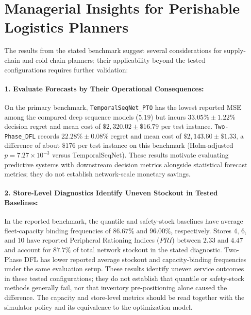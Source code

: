 \documentclass[11pt,a4paper]{article}
\theoremstyle{definition}
\theoremstyle{remark}
\begin{document}
\FloatBarrier
\section{Managerial Insights for Perishable Logistics Planners}
\label{sec:managerial_insights}

The results from the stated benchmark suggest several considerations for supply-chain and cold-chain planners; their applicability beyond the tested configurations requires further validation:

\paragraph{1. Evaluate Forecasts by Their Operational Consequences:}
On the primary benchmark, \texttt{TemporalSeqNet\_PTO} has the lowest reported MSE among the compared deep sequence models ($5.19$) but incurs $33.05\% \pm 1.22\%$ decision regret and mean cost of $\$2,320.02 \pm \$16.79$ per test instance. \texttt{Two-Phase\_DFL} records $22.28\% \pm 0.08\%$ regret and mean cost of $\$2,143.60 \pm \$1.33$, a difference of about $\$176$ per test instance on this benchmark (Holm-adjusted $p = 7.27 \times 10^{-3}$ versus TemporalSeqNet). These results motivate evaluating predictive systems with downstream decision metrics alongside statistical forecast metrics; they do not establish network-scale monetary savings.

\paragraph{2. Store-Level Diagnostics Identify Uneven Stockout in Tested Baselines:}
In the reported benchmark, the quantile and safety-stock baselines have average fleet-capacity binding frequencies of $86.67\%$ and $96.00\%$, respectively. Stores 4, 6, and 10 have reported Peripheral Rationing Indices ($PRI$) between $2.33$ and $4.47$ and account for $87.7\%$ of total network stockout in the stated diagnostic. Two-Phase DFL has lower reported average stockout and capacity-binding frequencies under the same evaluation setup. These results identify uneven service outcomes in these tested configurations; they do not establish that quantile or safety-stock methods generally fail, nor that inventory pre-positioning alone caused the difference. The capacity and store-level metrics should be read together with the simulator policy and its equivalence to the optimization model.
\end{document}

